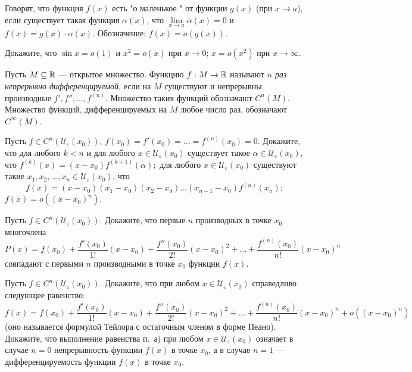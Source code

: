 \documentclass[a4paper, 11pt]{article}
\newcommand{\0}[1]{\overline{#1}}
\def\U{{\mathcal U}}
\begin{document}








 Говорят, что функция $f(x)$ есть "о маленькое " от функции $g(x)$
(при $x\rightarrow a$), если существует такая функция $\alpha(x)$, что
$\lim\limits_{x\rightarrow a}\alpha(x)=0$ и
$f(x)=g(x)\cdot\alpha(x)$.
Обозначение: $f(x)=o(g(x))$.

 Докажите, что
$\sin x=o(1)$ и $x^2=o(x)$
при $x\rightarrow 0$;
$x=o(x^2)$ при $x\rightarrow \infty$.

 Пусть $M\subseteq\mathbb{R}$ --- открытое множество.
Функцию $f:M\rightarrow\mathbb{R}$ называют {\em $n$ раз
непрерывно дифференцируемой},
если на $M$ существуют
и непрерывны производные $f',f'',\dots,f^{(n)}$. Множество
таких функций обозначают $C^{n}(M)$.
Множество функций, дифференцируемых на $M$
любое число раз, обозначают $C^{\infty}(M)$.

 Пусть $f\in C^{n}(\U_\varepsilon(x_0))$,
$f(x_0)=f'(x_0)=\dots=f^{(n)}(x_0)=0$. Докажите, что
 для любого $k<n$ и для любого $x\in\U_\varepsilon(x_0)$ существует
такое $\alpha\in\U_\varepsilon(x_0)$, что
$f^{(k)}(x)=(x-x_0)f^{(k+1)}(\alpha);$
 для любого $x\in\U_\varepsilon(x_0)$ существуют такие $x_1,x_2,\dots,x_n\in\U_\varepsilon(x_0)$,
что $$f(x)=(x-x_0)(x_1-x_0)(x_2-x_0)\dots(x_{n-1}-x_0)f^{(n)}(x_n);$$
 $f(x)=o((x-x_0)^n)$.

 Пусть $f\in C^n(\U_\varepsilon(x_0))$. Докажите, что первые $n$ производных
в точке $x_0$ многочлена
$$P(x)=f(x_0)+\frac{f'(x_0)}{1!}(x-x_0)+\frac{f''(x_0)}{2!}(x-x_0)^2+\dots+\frac{f^{(n)}(x_0)}{n!}(x-x_0)^n$$
совпадают с первыми $n$ производными в точке $x_0$ функции $f(x)$.


Пусть $f\in C^n(\U_\varepsilon(x_0))$. Докажите, что
при любом $x\in\U_\varepsilon(x_0)$
справедливо следующее равенство:
$$f(x)=f(x_0)+\frac{f'(x_0)}{1!}(x-x_0)+\frac{f''(x_0)}{2!}(x-x_0)^2+\dots+\frac{f^{(n)}(x_0)}{n!}(x-x_0)^n+o((x-x_0)^n)$$
(оно называется формулой Тейлора с остаточным членом в форме Пеано).\\
Докажите, что выполнение равенства п.~а) при любом $x\in\U_\varepsilon(x_0)$
означает в случае $n=0$
непрерывность функции $f(x)$ в точке $x_0$,
а в случае $n=1$ --- дифференцируемость функции $f(x)$ в точке $x_0$.
\end{document}
